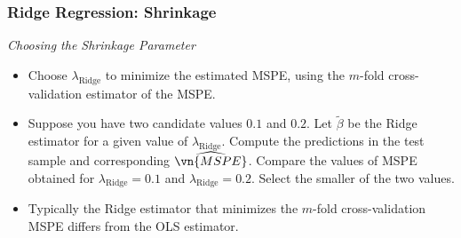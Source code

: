 \begin{frame}
\frametitle{Ridge Regression: Shrinkage}
\emph{Choosing the Shrinkage Parameter}
\begin{itemize}
\item Choose $\lambda_{\text{Ridge}}$ to minimize the estimated MSPE, using the $m$-fold cross-validation estimator of the MSPE. 
\item Suppose you have two candidate values $0.1$ and $0.2$. Let $\tilde{\beta}$ be the Ridge estimator for a given value of $\lambda_{\text{Ridge}}$. Compute the predictions in the test sample and corresponding $\widehat{\vn{MSPE}}$. Compare the values of MSPE obtained for $\lambda_{\text{Ridge}}=0.1$ and $\lambda_{\text{Ridge}}=0.2$. Select the smaller of the two values. 
\item Typically the Ridge estimator that minimizes the $m$-fold cross-validation MSPE differs from the OLS estimator. 
\end{itemize}
\end{frame}

